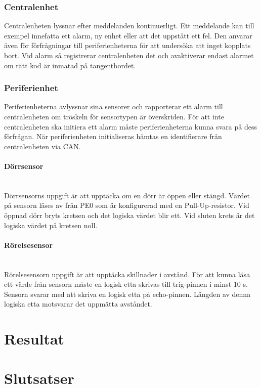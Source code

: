 \documentclass[a4paper]{article}
\newcommand{\subsubsubsection}[1]{\paragraph{#1}\mbox{}\\}
\begin{document}
\subsubsection{Centralenhet}
Centralenheten lyssnar efter meddelanden kontinuerligt.
Ett meddelande kan till exempel innefatta ett alarm, ny enhet eller att det uppstått ett fel.
Den anvarar även för förfrågningar till periferienheterna för att undersöka att inget kopplats bort.
Vid alarm så registrerar centralenheten det och avaktiverar endast alarmet om rätt kod är inmatad på tangentbordet.

\subsubsection{Periferienhet}
Periferienheterna avlyssnar sina sensorer och rapporterar ett alarm till centralenheten om tröskeln för sensortypen är överskriden.
För att inte centralenheten ska initiera ett alarm måste periferienheterna kunna svara på dess förfrågan.
När periferienheten initialiseras hämtas en identifierare från centralenheten via CAN.

\subsubsubsection{Dörrsensor}
Dörrsensorns uppgift är att upptäcka om en dörr är öppen eller stängd.
Värdet på sensorn läses av från PE0 som är konfigurerad med en Pull-Up-resistor.
Vid öppnad dörr bryts kretsen och det logiska värdet blir ett.
Vid sluten krets är det logiska värdet på kretsen noll.

\subsubsubsection{Rörelsesensor}
Rörelsesensorn uppgift är att upptäcka skillnader i avstånd.
För att kunna läsa ett värde från sensorn måste en logisk etta skrivas till trig-pinnen i minst 10 \textmu s.
Sensorn svarar med att skriva en logisk etta på echo-pinnen.
Längden av denna logiska etta motsvarar det uppmätta avståndet.

\section{Resultat}

\section{Slutsatser}




\end{document}

